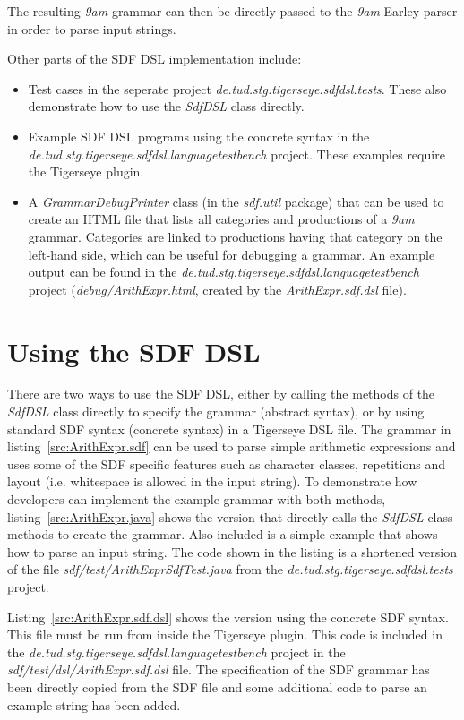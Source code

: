 \documentclass[article,linedtoc,colorback,accentcolor=tud4c,10pt]{tudreport}
\newcommand{\J}[1]{\textit{#1}}
\newcommand{\Jclass}[1]{\J{#1}}
\newcommand{\Jpkg}[1]{\J{#1}}
\newcommand{\Jfile}[1]{\J{#1}}
\begin{document}
The resulting \emph{9am} grammar can then be directly passed to the \emph{9am} Earley parser in order to parse input strings.

Other parts of the SDF DSL implementation include:
\begin{itemize}
\item Test cases in the seperate project \Jpkg{de.tud.stg.tigerseye.sdfdsl.tests}. These also demonstrate how to use the \Jclass{SdfDSL} class directly.
\item Example SDF DSL programs using the concrete syntax in the \Jpkg{de.tud.stg.tigerseye.sdfdsl.languagetestbench} project. These examples require the Tigerseye plugin.
\item A \Jclass{GrammarDebugPrinter} class (in the \Jpkg{sdf.util} package) that can be used to create an HTML file that lists all categories and productions of a \emph{9am} grammar. Categories are linked to productions having that category on the left-hand side, which can be useful for debugging a grammar. An example output can be found in the \Jpkg{de.tud.stg.tigerseye.sdfdsl.languagetestbench} project (\Jfile{debug/ArithExpr.html}, created by the \Jfile{ArithExpr.sdf.dsl} file).
\end{itemize}

\hspace{0.5em}
  \section{Using the SDF DSL}

There are two ways to use the SDF DSL, either by calling the methods of the \Jclass{SdfDSL} class directly to specify the grammar (abstract syntax), or by using standard SDF syntax (concrete syntax) in a Tigerseye DSL file.
The grammar in listing~\ref{src:ArithExpr.sdf} can be used to parse simple arithmetic expressions and uses some of the SDF specific features such as character classes, repetitions and layout (i.e. whitespace is allowed in the input string).
To demonstrate how developers can implement the example grammar with both methods, listing~\ref{src:ArithExpr.java} shows the version that directly calls the \Jclass{SdfDSL} class methods to create the grammar. Also included is a simple example that shows how to parse an input string. The code shown in the listing is a shortened version of the file \Jfile{sdf/test/ArithExprSdfTest.java} from the \Jpkg{de.tud.stg.tigerseye.sdfdsl.tests} project.

Listing~\ref{src:ArithExpr.sdf.dsl} shows the version using the concrete SDF syntax. This file must be run from inside the Tigerseye plugin. This code is included in the \Jpkg{de.tud.stg.tigerseye.sdfdsl.languagetestbench} project in the \Jfile{sdf/test/dsl/ArithExpr.sdf.dsl} file. The specification of the SDF grammar has been directly copied from the SDF file and some additional code to parse an example string has been added.
\end{document}

